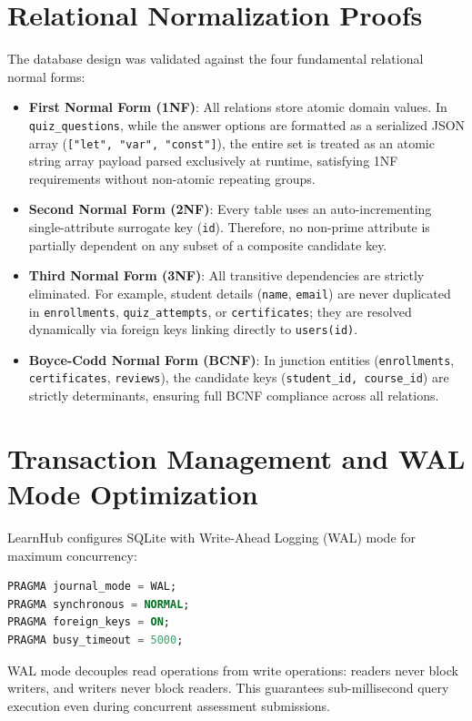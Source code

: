 \documentclass[12pt,a4paper]{report}
\begin{document}
\section{Relational Normalization Proofs}
The database design was validated against the four fundamental relational normal forms:
\begin{itemize}[itemsep=4pt]
    \item \textbf{First Normal Form (1NF)}: All relations store atomic domain values. In \texttt{quiz\_questions}, while the answer options are formatted as a serialized JSON array (\texttt{["let", "var", "const"]}), the entire set is treated as an atomic string array payload parsed exclusively at runtime, satisfying 1NF requirements without non-atomic repeating groups.
    \item \textbf{Second Normal Form (2NF)}: Every table uses an auto-incrementing single-attribute surrogate key (\texttt{id}). Therefore, no non-prime attribute is partially dependent on any subset of a composite candidate key.
    \item \textbf{Third Normal Form (3NF)}: All transitive dependencies are strictly eliminated. For example, student details (\texttt{name}, \texttt{email}) are never duplicated in \texttt{enrollments}, \texttt{quiz\_attempts}, or \texttt{certificates}; they are resolved dynamically via foreign keys linking directly to \texttt{users(id)}.
    \item \textbf{Boyce-Codd Normal Form (BCNF)}: In junction entities (\texttt{enrollments}, \texttt{certificates}, \texttt{reviews}), the candidate keys (\texttt{student\_id, course\_id}) are strictly determinants, ensuring full BCNF compliance across all relations.
\end{itemize}

\section{Transaction Management and WAL Mode Optimization}
LearnHub configures SQLite with Write-Ahead Logging (WAL) mode for maximum concurrency:
\begin{lstlisting}[language=SQL]
PRAGMA journal_mode = WAL;
PRAGMA synchronous = NORMAL;
PRAGMA foreign_keys = ON;
PRAGMA busy_timeout = 5000;
\end{lstlisting}
WAL mode decouples read operations from write operations: readers never block writers, and writers never block readers. This guarantees sub-millisecond query execution even during concurrent assessment submissions.
\end{document}
